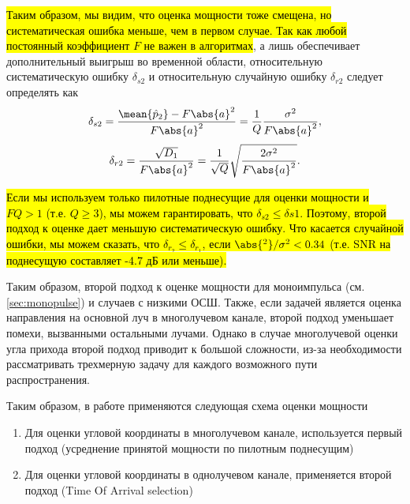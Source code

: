 \hl{
Таким образом, мы видим, что оценка мощности тоже смещена, но систематическая
ошибка меньше, чем в первом случае.
Так как любой постоянный коэффициент $F$ не важен в алгоритмах}, а
лишь обеспечивает дополнительный выигрыш во временной области, относительную
систематическую ошибку $\delta_{s2}$ и относительную случайную ошибку $\delta_{r2}$ следует
определять как
\begin{equation}
    \delta_{s2} = \frac{\mean{\hat p_2} - F \abs{a}^2}{F \abs{a}^2} = \frac{1}{Q} \frac{\sigma^2}{F\abs{a}^2},
\end{equation}
\begin{equation}
    \delta_{r2} = \frac{\sqrt{D_1}}{F\abs{a}^2} = \frac{1}{\sqrt Q} \sqrt{\frac{2\sigma^2}{F\abs{a}^2}}.
\end{equation}

\hl{
Если мы используем только пилотные поднесущие для оценки мощности и $FQ > 1$ (т.е. $Q\geq 3$),
мы можем гарантировать, что $\delta_{s2} \leq \delta{s1}$. Поэтому, второй подход к оценке дает меньшую
систематическую ошибку. Что касается случайной ошибки, мы можем сказать, что $\delta_{r_2} \leq \delta_{r_1}$, если
$\abs{^2}/\sigma^2 < 0.34$ (т.е. SNR на поднесущую составляет -4.7 дБ или меньше).
}

Таким образом, второй подход к оценке мощности для моноимпульса (см. \ref{sec:monopulse}) и случаев с
низкими ОСШ. Также, если задачей является оценка направления на основной луч в
многолучевом канале, второй подход уменьшает помехи, вызванными остальными лучами.
Однако в случае многолучевой оценки угла прихода второй подход приводит к
большой сложности, из-за необходимости рассматривать трехмерную задачу для
каждого возможного пути распространения.

Таким образом, в работе применяются следующая схема оценки мощности
\begin{enumerate}
    \item Для оценки угловой координаты в многолучевом канале, используется первый подход (усреднение принятой мощности по пилотным поднесущим) \\
    \item Для оценки угловой координаты в однолучевом канале, применяется второй подход (Time Of Arrival selection) \\
\end{enumerate}
